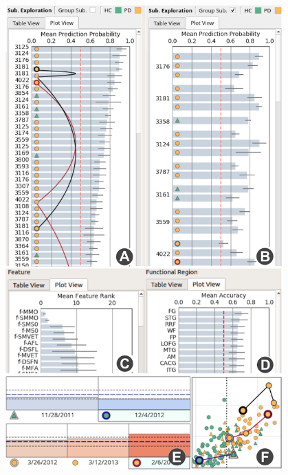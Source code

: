 \begin{figure}[t]
\centering
\includegraphics[width=0.95\textwidth]{images/plotView4.png}%

\end{figure}
